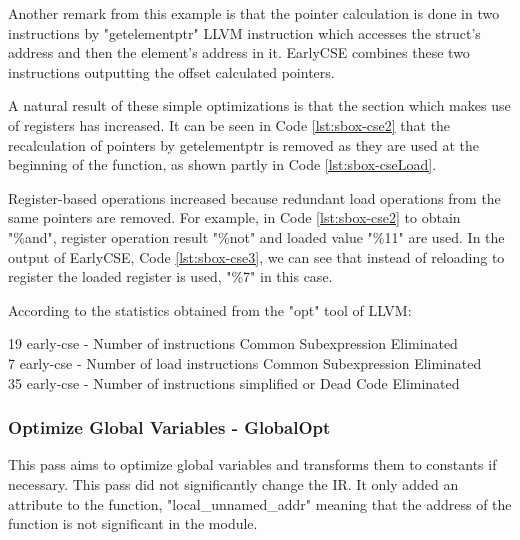 

Another remark from this example is that the pointer calculation is done in two instructions by "getelementptr" LLVM instruction which accesses the struct's address and then the element's address in it. EarlyCSE combines these two instructions outputting the offset calculated pointers.

A natural result of these simple optimizations is that the section which makes use of registers has increased. It can be seen in Code \ref{lst:sbox-cse2} that the recalculation of pointers by getelementptr is removed as they are used at the beginning of the function, as shown partly in Code \ref{lst:sbox-cseLoad}.


 

Register-based operations increased because redundant load operations from the same pointers are removed. For example, in Code \ref{lst:sbox-cse2} to obtain "\%and", register operation result "\%not" and loaded value "\%11" are used. In the output of EarlyCSE, Code \ref{lst:sbox-cse3}, we can see that instead of reloading to register the loaded register is used, "\%7" in this case.

According to the statistics obtained from the "opt" tool of LLVM:
\begin{displayquote}
19 early-cse - Number of instructions Common Subexpression Eliminated \\
 7 early-cse - Number of load instructions Common Subexpression Eliminated \\
35 early-cse - Number of instructions simplified or Dead Code Eliminated \\
\end{displayquote}


\subsubsection{Optimize Global Variables - GlobalOpt}
This pass aims to optimize global variables and transforms them to constants if necessary. This pass did not significantly change the IR. It only added an attribute to the function, "local\_unnamed\_addr" meaning that the address of the function is not significant in the module.

